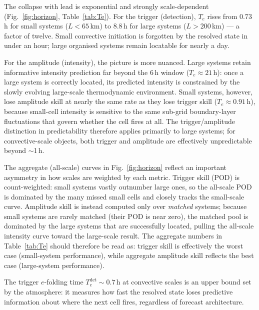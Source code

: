 \documentclass[11pt]{article}
\begin{document}
The collapse with lead is exponential and strongly scale-dependent
(Fig.~\ref{fig:horizon}, Table~\ref{tab:Te}).
For the trigger (detection), $T_e$ rises from $0.73$\,h for small systems
($L<65$\,km) to $8.8$\,h for large systems ($L>200$\,km) --- a factor of
twelve. Small convective initiation is forgotten by the resolved state in
under an hour; large organised systems remain locatable for nearly a day.

For the amplitude (intensity), the picture is more nuanced.
Large systems retain informative intensity prediction far beyond the $6$\,h
window ($T_e\!\approx\!21$\,h): once a large system is correctly located, its
predicted intensity is constrained by the slowly evolving large-scale
thermodynamic environment.
Small systems, however, lose amplitude skill at nearly the same rate as they
lose trigger skill ($T_e\!\approx\!0.91$\,h), because small-cell intensity is
sensitive to the same sub-grid boundary-layer fluctuations that govern whether
the cell fires at all.
The trigger/amplitude distinction in predictability therefore applies primarily
to large systems; for convective-scale objects, both trigger and amplitude are
effectively unpredictable beyond $\sim$1\,h.

The aggregate (all-scale) curves in Fig.~\ref{fig:horizon} reflect an
important asymmetry in how scales are weighted by each metric.
Trigger skill (POD) is count-weighted: small systems vastly outnumber large
ones, so the all-scale POD is dominated by the many missed small cells and
closely tracks the small-scale curve.
Amplitude skill is instead computed only over \emph{matched} systems; because
small systems are rarely matched (their POD is near zero), the matched pool is
dominated by the large systems that are successfully located, pulling the
all-scale intensity curve toward the large-scale result.
The aggregate numbers in Table~\ref{tab:Te} should therefore be read as:
trigger skill is effectively the worst case (small-system performance), while
aggregate amplitude skill reflects the best case (large-system performance).

The trigger $e$-folding time $T_e^{\text{det}}\!\sim\!0.7$\,h at convective
scales is an upper bound set by the atmosphere: it measures how fast the
resolved state loses predictive information about where the next cell fires,
regardless of forecast architecture.
\end{document}
